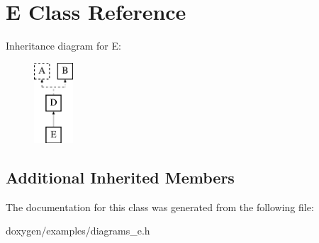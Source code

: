 \hypertarget{class_e}{}\section{E Class Reference}
\label{class_e}
Inheritance diagram for E\+:\begin{figure}[H]
\begin{center}
\leavevmode
\includegraphics[height=3.000000cm]{class_e}
\end{center}
\end{figure}
\subsection*{Additional Inherited Members}


The documentation for this class was generated from the following file\+:\begin{DoxyCompactItemize}
\item 
doxygen/examples/diagrams\+\_\+e.\+h\end{DoxyCompactItemize}

